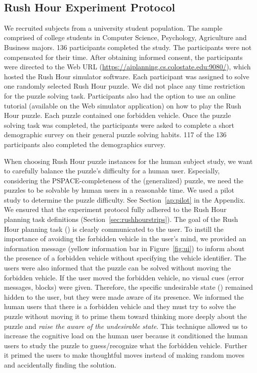~\subsection{Rush Hour Experiment Protocol}
\label{sec:rushhourexperiment1}
We recruited subjects from a university student population. 
The sample comprised of college students in Computer Science, Psychology, Agriculture and Business majors. 
136 participants completed  the study. 
The participants were not compensated for their time. 
After obtaining informed consent, the participants were directed to the Web URL (\url{https://aiplanning.cs.colostate.edu:9080/}), which hosted the Rush Hour simulator software. 
Each participant was assigned to solve one randomly selected Rush Hour puzzle. 
We did not place any time restriction for the puzzle solving task. Participants also had the option to use an online tutorial (available on the Web simulator application) on how to play the Rush Hour puzzle. 
Each puzzle contained one forbidden vehicle. 
Once the puzzle solving task was completed, the participants were asked to complete a short demographic survey on their general puzzle solving habits. 
117 of the 136 participants also completed the demographics survey. 

When choosing Rush Hour puzzle instances for the human subject study, we want to carefully balance the puzzle’s difficulty for a human user. 
Especially, considering the PSPACE-completeness of the (generalized)
puzzle, we need the puzzles to be solvable by human users in a reasonable time. 
We used a pilot study to determine the puzzle difficulty. 
See Section~\ref{ap:pilot} in the Appendix.
We ensured that the experiment protocol fully adhered to the Rush Hour planning task definitions (Section~\ref{sec:rushhourstrips}). 
The goal of the Rush Hour planning task (\desired) is clearly communicated to the user.
To instill the importance of avoiding the forbidden vehicle in the user’s mind, we provided an information message (yellow information bar in Figure~\ref{fig:ui}) to inform about the presence of a forbidden vehicle without specifying the vehicle identifier.
The users were also informed that the puzzle can be solved without moving the forbidden vehicle.
If the user moved the forbidden vehicle, no visual cues (error messages, blocks) were given. 
Therefore, the specific undesirable state (\undesired) remained hidden to the user, but they were made aware of its presence.
We informed the  human users that there is a forbidden vehicle and they must try to solve the puzzle without moving it to prime them toward thinking more deeply about the puzzle and \textit{raise the aware of the undesirable state}. 
This technique allowed us to increase the cognitive load on the human user because it conditioned the human users to study the puzzle to guess/recognize what the forbidden vehicle.
Further it primed the users to make thoughtful moves instead of making random moves and accidentally finding the solution.


